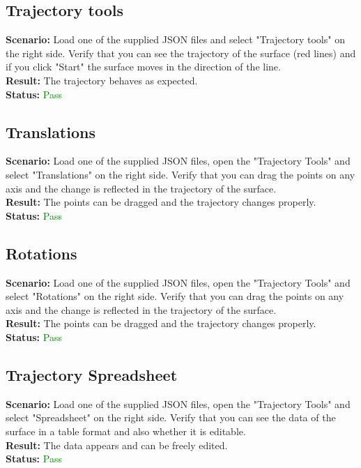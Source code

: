\documentclass[a4paper, 11pt, article]{report}
\begin{document}
\subsection{Trajectory tools}

\noindent \textbf{Scenario:} Load one of the supplied JSON files and select "Trajectory tools" on the right side. Verify that you can see the trajectory of the surface (red lines) and if you click "Start" the surface moves in the direction of the line.
\\
\noindent \textbf{Result:} The trajectory behaves as expected.
\\
\noindent \textbf{Status:} \textcolor{green}{Pass}

\subsection{Translations}

\noindent \textbf{Scenario:} Load one of the supplied JSON files, open the "Trajectory Tools" and select "Translations" on the right side. Verify that you can drag the points on any axis and the change is reflected in the trajectory of the surface.
\\
\noindent \textbf{Result:} The points can be dragged and the trajectory changes properly.
\\
\noindent \textbf{Status:} \textcolor{green}{Pass}

\subsection{Rotations}

\noindent \textbf{Scenario:} Load one of the supplied JSON files, open the "Trajectory Tools" and select "Rotations" on the right side. Verify that you can drag the points on any axis and the change is reflected in the trajectory of the surface.
\\
\noindent \textbf{Result:} The points can be dragged and the trajectory changes properly.
\\
\noindent \textbf{Status:} \textcolor{green}{Pass}

\subsection{Trajectory Spreadsheet}

\noindent \textbf{Scenario:} Load one of the supplied JSON files, open the "Trajectory Tools" and select "Spreadsheet" on the right side. Verify that you can see the data of the surface in a table format and also whether it is editable.
\\
\noindent \textbf{Result:} The data appears and can be freely edited.
\\
\noindent \textbf{Status:} \textcolor{green}{Pass}
\end{document}

